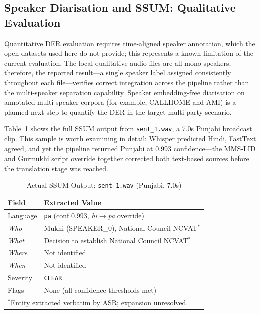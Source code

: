 \documentclass[12pt, onecolumn]{IEEEtran}
\begin{document}
\subsection{Speaker Diarisation and SSUM: Qualitative Evaluation}
\label{sec:isum_eval}

Quantitative DER evaluation requires time-aligned speaker annotation, which the open datasets used here do not provide; this represents a known limitation of the current evaluation. The local qualitative audio files are all mono-speakers; therefore, the reported result---a single speaker label assigned consistently throughout each file---verifies correct integration across the pipeline rather than the multi-speaker separation capability. Speaker embedding-free diarisation on annotated multi-speaker corpora (for example, CALLHOME and AMI) is a planned next step to quantify the DER in the target multi-party scenario.

Table~\ref{tab:isum_example} shows the full SSUM output from \texttt{sent\_1.wav}, a 7.0s Punjabi broadcast clip. This sample is worth examining in detail: Whisper predicted Hindi, FastText agreed, and yet the pipeline returned Punjabi at 0.993 confidence---the MMS-LID and Gurmukhi script override together corrected both text-based sources before the translation stage was reached.

\begin{table}[htbp]
\caption{Actual SSUM Output: \texttt{sent\_1.wav} (Punjabi, 7.0s)}
\label{tab:isum_example}
\begin{center}
\begin{tabular}{p{1.5cm}p{5.8cm}}
\toprule
\textbf{Field} & \textbf{Extracted Value} \\
\midrule
Language   & \texttt{pa} (conf 0.993, \textit{hi}$\rightarrow$\textit{pa} override) \\
\textit{Who}   & Mukhi (SPEAKER\_0), National Council NCVAT$^*$ \\
\textit{What}  & Decision to establish National Council NCVAT$^*$ \\
\textit{Where} & Not identified \\
\textit{When}  & Not identified \\
Severity       & \texttt{CLEAR} \\
Flags          & None (all confidence thresholds met) \\
\midrule
\multicolumn{2}{l}{\footnotesize $^*$Entity extracted verbatim by ASR; expansion unresolved.} \\
\bottomrule
\end{tabular}
\end{center}
\end{table}
\end{document}
